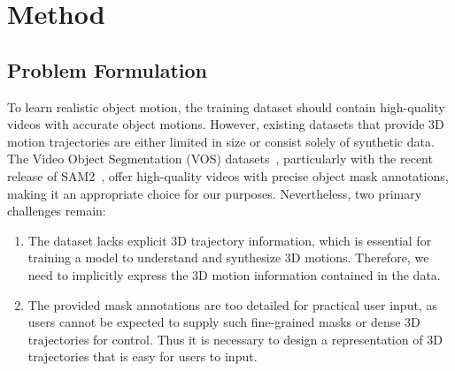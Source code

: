 \section{Method}\label{sec:method}
\label{sec::method}



\subsection{Problem Formulation}

To learn realistic object motion, the training dataset should contain high-quality videos with accurate object motions. However, existing datasets that provide 3D motion trajectories are either limited in size or consist solely of synthetic data. The Video Object Segmentation (VOS) datasets~\cite{davis, SAM2}, particularly with the recent release of SAM2~\cite{SAM2}, offer high-quality videos with precise object mask annotations, making it an appropriate choice for our purposes. Nevertheless, two primary challenges remain:

\begin{enumerate}
    \item The dataset lacks explicit 3D trajectory information, which is essential for training a model to understand and synthesize 3D motions. Therefore, we need to implicitly express the 3D motion information contained in the data.
    \item The provided mask annotations are too detailed for practical user input, as users cannot be expected to supply such fine-grained masks or dense 3D trajectories for control. Thus it is necessary to design a representation of 3D trajectories that is easy for users to input.
\end{enumerate}

